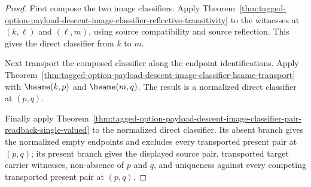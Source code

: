 \begin{proof}
First compose the two image classifiers. Apply
Theorem~\ref{thm:tagged-option-payload-descent-image-classifier-reflective-transitivity}
to the witnesses at $(k,\ell)$ and $(\ell,m)$, using source compatibility and
source reflection. This gives the direct classifier from $k$ to $m$.

Next transport the composed classifier along the endpoint identifications.
Apply
Theorem~\ref{thm:tagged-option-payload-descent-image-classifier-hsame-transport}
with $\hsame(k,p)$ and $\hsame(m,q)$. The result is a normalized direct
classifier at $(p,q)$.

Finally apply
Theorem~\ref{thm:tagged-option-payload-descent-image-classifier-pair-readback-single-valued}
to the normalized direct classifier. Its absent branch gives the normalized
empty endpoints and excludes every transported present pair at $(p,q)$; its
present branch gives the displayed source pair, transported target carrier
witnesses, non-absence of $p$ and $q$, and uniqueness against every competing
transported present pair at $(p,q)$.
\end{proof}

